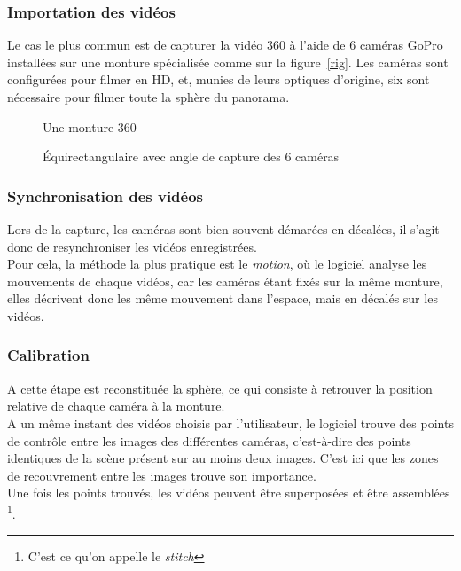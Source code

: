 \subsubsection{Importation des vidéos}
Le cas le plus commun est de capturer la vidéo 360 à l'aide de 6 caméras GoPro 
installées sur une monture spécialisée comme sur la figure~\ref{rig}. 
Les caméras sont configurées pour filmer en HD, et, munies de leurs optiques 
d'origine, six sont nécessaire pour filmer toute la sphère du panorama.
\begin{figure}
  \centering
  \begin{minipage}{0.4\textwidth}
    \centering
    \caption{Une monture 360}
    \label{rig}
  \end{minipage}
  \begin{minipage}{0.6\textwidth}
    \centering
    \caption{Équirectangulaire avec angle de capture des 6 caméras} 
    \label{equirectangulaire-inputs}
  \end{minipage}
\end{figure}

\subsubsection{Synchronisation des vidéos}
Lors de la capture, les caméras sont bien souvent démarées en décalées, il s'agit
donc de resynchroniser les vidéos enregistrées.\\
Pour cela, la méthode la plus pratique est le \textit{motion},
où le logiciel analyse les mouvements de chaque vidéos, car les caméras étant fixés
sur la même monture, elles décrivent donc les même mouvement dans l'espace, mais 
en décalés sur les vidéos.

\subsubsection{Calibration}
A cette étape est reconstituée la sphère, ce qui consiste à retrouver la 
position relative de chaque caméra à la monture.\\
A un même instant des vidéos choisis par l'utilisateur, le logiciel trouve des
points de contrôle entre les images des différentes caméras, c'est-à-dire des
points identiques de la scène présent sur au moins deux images. C'est ici que les 
zones de recouvrement entre les images trouve son importance.\\
Une fois les points trouvés, les vidéos peuvent être superposées et être assemblées
\footnote{C'est ce qu'on appelle le \textit{stitch}}.
\begin{figure}
  \centering
  \label{Les 6 entrées vidéos et les points de contrôles trouvés} 
\end{figure}

